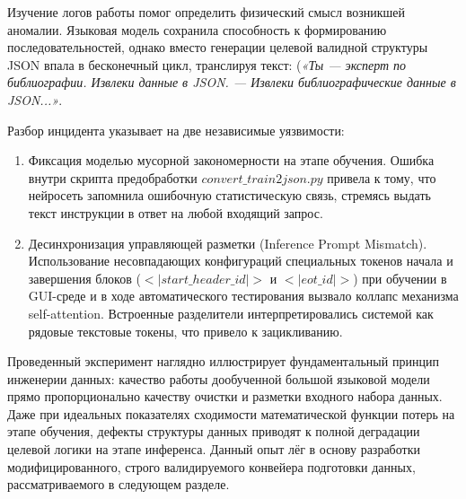 Изучение логов работы помог определить физический смысл возникшей аномалии. Языковая модель сохранила способность к формированию последовательностей, однако вместо генерации целевой валидной структуры JSON впала в бесконечный цикл, транслируя текст: (\textit{«Ты — эксперт по библиографии. Извлеки данные в JSON. — Извлеки библиографические данные в JSON...»}.

Разбор инцидента указывает на две независимые уязвимости:
\begin{enumerate}
    \item Фиксация моделью мусорной закономерности на этапе обучения. Ошибка внутри скрипта предобработки \(convert\_train2json.py\) привела к тому, что нейросеть запомнила ошибочную статистическую связь, стремясь выдать текст инструкции в ответ на любой входящий запрос.
    \item Десинхронизация управляющей разметки (Inference Prompt Mismatch). Использование несовпадающих конфигураций специальных токенов начала и завершения блоков (\(<\vert{}start\_header\_id\vert{}>\) и \(<\vert{}eot\_id\vert{}>\)) при обучении в GUI-среде и в ходе автоматического тестирования вызвало коллапс механизма self-attention. Встроенные разделители интерпретировались системой как рядовые текстовые токены, что привело к зацикливанию.
\end{enumerate}

Проведенный эксперимент наглядно иллюстрирует фундаментальный принцип инженерии данных: качество работы дообученной большой языковой модели прямо пропорционально качеству очистки и разметки входного набора данных. Даже при идеальных показателях сходимости математической функции потерь на этапе обучения, дефекты структуры данных приводят к полной деградации целевой логики на этапе инференса. Данный опыт лёг в основу разработки модифицированного, строго валидируемого конвейера подготовки данных, рассматриваемого в следующем разделе.